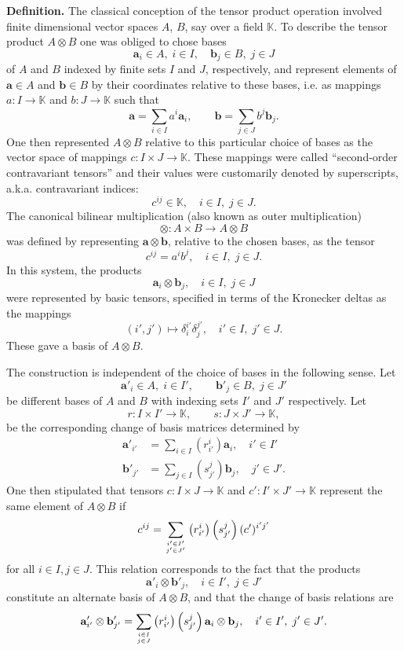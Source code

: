 \documentclass[12pt]{article}
\newcommand{\lp}{\left(}
\newcommand{\rp}{\right)}
\newcommand{\va}{\mathbf{a}}
\newcommand{\vb}{\mathbf{b}}
\newcommand{\hva}{\mathbf{a}'}
\newcommand{\hvb}{\mathbf{b}'}
\newcommand{\kfield}{\mathbb{K}}
\newcommand{\hI}{I'}
\newcommand{\hJ}{J'}
\newcommand{\hi}{{i'}}
\newcommand{\hj}{{j'}}
\newcommand{\hc}{c'}
\begin{document}
{\bf Definition.} The classical conception of the tensor product
operation involved finite dimensional vector spaces $A$, $B$, say over
a field $\kfield$.  To describe the tensor product $A\otimes B$ one
was obliged to chose bases
$$\va_i\in A,\; i\in I,\quad \vb_j\in B,\; j\in J$$
of $A$ and $B$ indexed
by finite sets $I$ and $J$, respectively, and represent elements of
$\va\in A$ and $\vb\in B$ by their coordinates relative to these bases,
i.e. as mappings $a:I\rightarrow \kfield$ and $b:J\rightarrow \kfield$
such that
$$\va = \sum_{i\in I} a^i \va_i,\qquad \vb=\sum_{j\in J} b^j \vb_j.$$
One then represented $A\otimes B$ relative to this particular choice
of bases as the vector space of mappings $c:I\times J\rightarrow
\kfield$.  These mappings were called ``second-order contravariant
tensors'' and their values were customarily denoted by superscripts,
a.k.a. contravariant indices:
$$c^{ij}\in \kfield,\quad i\in I,\; j\in J.$$
The canonical bilinear
multiplication (also known as outer multiplication)
$$\otimes:A\times B\rightarrow A\otimes B$$
was defined by
representing $\va\otimes \vb$, relative to the chosen bases, as the
tensor
$$c^{ij} = a^ib^j,\quad i\in I,\;j\in J.$$
In this system, the
products
$$\va_i\otimes \vb_j,\quad i\in I,\; j\in J$$
were represented by basic
tensors, specified in terms of the Kronecker deltas as the mappings
$$(i',j')\mapsto \delta^{i'}_i \delta^{j'}_j,\quad i'\in I,\; j'\in J.$$
These gave a basis of $A\otimes B$.


The construction is independent of the choice of bases in the
following sense.  Let
$$\hva_i\in A,\; i\in \hI,\qquad \hvb_j\in B,\; j\in \hJ$$
be different bases of $A$ and $B$ with indexing sets $\hI$
and $\hJ$ respectively.  Let
$$
r:I\times \hI\rightarrow \kfield,\qquad
s:J\times \hJ\rightarrow \kfield,
$$
be the corresponding change of basis matrices determined by
\begin{align*}
\hva_{\hi} &= \sum_{i\in I} \lp r^i_{i'}\rp \va_i,\quad \hi\in I'\\
\hvb_{\hj} &= \sum_{j\in I} \lp s^j_{j'}\rp \vb_j,\quad \hj\in J'.
\end{align*}
One then stipulated that tensors $c:I\times J\rightarrow \kfield$ and 
$\hc:\hI\times \hJ\rightarrow \kfield$ represent the same element of
$A\otimes B$ if 
\begin{equation}
  \label{eq:eq1}
c^{ij} = \sum_{\genfrac{}{}{0pt}{}{i'\in I'}{j'\in J'}}
\lp r^i_{i'}\rp \lp s^j_{j'}\rp (c')^{i'j'}  
\end{equation}
for all $i\in I, j\in J$.  This relation corresponds to the fact that
the products
$$\hva_i\otimes \hvb_j,\quad i\in I',\; j\in J'$$
constitute an alternate basis of $A\otimes B$, and that the change of
basis relations are
\begin{equation}
  \label{eq:eq2}
  \hva_\hi \otimes \hvb_\hj = \sum_{\genfrac{}{}{0pt}{}{i\in I}{j\in J}}
  \lp r^i_{i'}\rp \lp s^j_{j'}\rp \va_i\otimes \vb_j,\quad
  \hi\in I',\; \hj\in J'.  
\end{equation}
\end{document}
